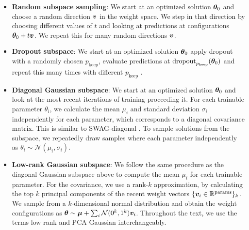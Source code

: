 \documentclass{article}
\begin{document}
\begin{itemize}\itemsep0em
    \item \textbf{Random subspace sampling}: We start at an optimized solution ${\bm{\theta}}_0$ and choose a random direction ${\bm{v}}$ in the weight space. We step in that direction by choosing different values of $t$ and looking at predictions at configurations ${\bm{\theta}}_0 + t {\bm{v}}$. We repeat this for many random directions ${\bm{v}}$. %
    \item %
    \textbf{Dropout subspace}: We start at an optimized solution ${\bm{\theta}}_0$  apply dropout with a randomly chosen $p_\mathrm{keep}$, evaluate predictions at $\mathrm{dropout}_{p_\mathrm{keep}}({\bm{\theta}}_0)$ and repeat this many times with different  $p_\mathrm{keep}$ .
    \item \textbf{Diagonal Gaussian subspace}: We start at an optimized solution ${\bm{\theta}}_0$ and look at the most recent iterations of training proceeding it. For each trainable parameter $\theta_i$, we calculate the mean $\mu_i$ and standard deviation $\sigma_i$ independently for each parameter, which corresponds to a diagonal covariance matrix.  This is similar to SWAG-diagonal \citep{maddox2019simple}. To sample solutions from the subspace, we repeatedly draw samples where each parameter independently as $\theta_i \sim \mathcal{N}(\mu_i,\sigma_i)$. %
   
    \item \textbf{Low-rank Gaussian subspace}: 
    We follow the same procedure as the diagonal Gaussian subspace above to compute the  mean $\mu_i$  for each trainable parameter. %
    For the covariance, we use a rank-$k$ approximation, by calculating the top $k$ principal components of the recent  weight vectors %
    $\{ {{\bm{v}}}_i \in \mathbb{R}^\mathrm{params} \}_k$. We sample from a $k$-dimensional normal distribution and obtain the weight configurations as ${\bm{\theta}} \sim {{\bm{\mu}}} + \sum_i \mathcal{N}(0^k,1^k) {{\bm{v}}}_i$.  Throughout the text, we use the terms low-rank and PCA Gaussian interchangeably. %
\end{itemize}
\end{document}
